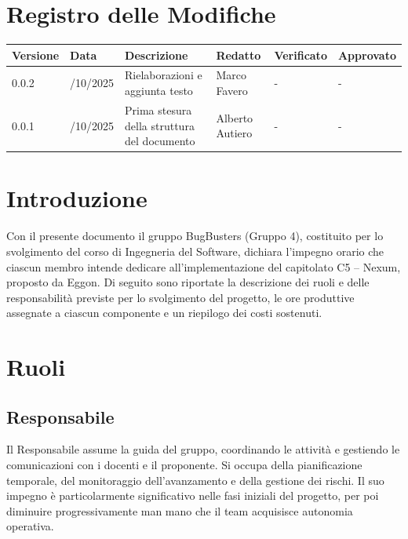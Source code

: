 \documentclass[a4paper,11pt]{article}
\newcommand{\CurrentVersion}{0.0.2}
\begin{document}
\newpage

\section*{Registro delle Modifiche}


\setlength{\extrarowheight}{2pt} %
\renewcommand{\arraystretch}{1.5} 

{\footnotesize
\begin{tabularx}{\textwidth}{|>{\raggedright\arraybackslash}p{1.5cm}|>{\raggedright\arraybackslash}p{2cm}|X|>{\raggedright\arraybackslash}p{2cm}|>{\raggedright\arraybackslash}p{2cm}|>{\raggedright\arraybackslash}p{2cm}|}
\hline
\rowcolor{primaryblue!40}
\textbf{\color{white} Versione} & \textbf{\color{white} Data} & \textbf{\color{white} Descrizione} & \textbf{\color{white} Redatto} & \textbf{\color{white} Verificato} & \textbf{\color{white} Approvato} \\
\hline
\rowcolor{secondaryblue!10} \CurrentVersion & 26/10/2025 & Rielaborazioni e aggiunta testo & Marco Favero & - & - \\
\hline
\rowcolor{secondaryblue!10} 0.0.1 & 23/10/2025 & Prima stesura della struttura del documento & Alberto Autiero & - & - \\
\hline

\end{tabularx}
}




\newpage
\tableofcontents
\newpage

\section{Introduzione}
Con il presente documento il gruppo BugBusters (Gruppo 4), costituito per lo svolgimento del corso di Ingegneria del Software, 
dichiara l'impegno orario che ciascun membro intende dedicare all'implementazione del capitolato C5 -- Nexum, proposto da Eggon. 
Di seguito sono riportate la descrizione dei ruoli e delle responsabilità previste per lo svolgimento del progetto, 
le ore produttive assegnate a ciascun componente e un riepilogo dei costi sostenuti.

\newpage

\section{Ruoli}

\subsection{Responsabile}
Il Responsabile assume la guida del gruppo, coordinando le attività e gestiendo le comunicazioni con i docenti e il proponente. Si occupa della pianificazione temporale, del monitoraggio dell'avanzamento e della gestione dei rischi. Il suo impegno è particolarmente significativo nelle fasi iniziali del progetto, per poi diminuire progressivamente man mano che il team acquisisce autonomia operativa.
\end{document}
